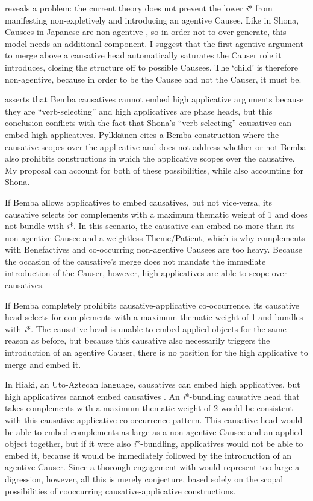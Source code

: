 \documentclass[output=paper,modfonts,nonflat,colorlinks,citecolor=brown]{langsci/langscibook}
\begin{document}
 reveals a problem: the current theory does not prevent the lower \textit{i}* from manifesting non-expletively and introducing an agentive Causee. Like in Shona, Causees in Japanese are non-agentive \citep[107]{Pylkkänen2008}, so in order not to over-generate, this model needs an additional component. I suggest that the first agentive argument to merge above a causative head automatically saturates the Causer role it introduces, closing the structure off to possible Causees. The ‘child’ is therefore non-agentive, because in order to be the Causee and not the Causer, it must be.



\citet{Pylkkänen2008} asserts that Bemba causatives cannot embed high applicative arguments because they are “verb-selecting” and high applicatives are phase heads, but this conclusion conflicts with the fact that Shona’s “verb-selecting” causatives can embed high applicatives. Pylkkänen cites a Bemba construction where the causative scopes over the applicative and does not address whether or not Bemba also prohibits constructions in which the applicative scopes over the causative. My proposal can account for both of these possibilities, while also accounting for Shona.


\largerpage
If Bemba allows applicatives to embed causatives, but not vice-versa, its causative selects for complements with a maximum thematic weight of 1 and does not bundle with \textit{i}*. In this scenario, the causative can embed no more than its non-agentive Causee and a weightless Theme/Patient, which is why complements with Benefactives and co-occurring non-agentive Causees are too heavy. Because the occasion of the causative’s merge does not mandate the immediate introduction of the Causer, however, high applicatives are able to scope over causatives.



If Bemba completely prohibits causative-applicative co-occurrence, its causative head selects for complements with a maximum thematic weight of 1 and bundles with \textit{i}*. The causative head is unable to embed applied objects for the same reason as before, but because this causative also necessarily triggers the introduction of an agentive Causer, there is no position for the high applicative to merge and embed it.



In Hiaki, an Uto-Aztecan language, causatives can embed high applicatives, but high applicatives cannot embed causatives \citep{Jung2014}. An \textit{i}*-bundling causative head that takes complements with a maximum thematic weight of 2 would be consistent with this causative-applicative co-occurrence pattern. This causative head would be able to embed complements as large as a non-agentive Causee and an applied object together, but if it were also \textit{i}*-bundling, applicatives would not be able to embed it, because it would be immediately followed by the introduction of an agentive Causer. Since a thorough engagement with \citet{Jung2014} would represent too large a digression, however, all this is merely conjecture, based solely on the scopal possibilities of cooccurring causative-applicative constructions.
\end{document}
